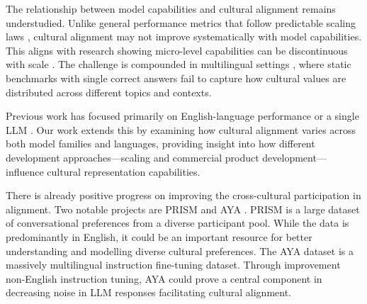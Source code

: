 The relationship between model capabilities and cultural alignment remains understudied. Unlike general performance metrics that follow predictable scaling laws \citep{kaplanScalingLawsNeural2020}, cultural alignment may not improve systematically with model capabilities. This aligns with research showing micro-level capabilities can be discontinuous with scale \citep{ganguliPredictabilitySurpriseLarge2022}. The challenge is compounded in multilingual settings \citep{hoffmannTrainingComputeoptimalLarge2022a}, where static benchmarks with single correct answers fail to capture how cultural values are distributed across different topics and contexts.

Previous work has focused primarily on English-language performance \citep{taoCulturalBiasCultural2024} or a single LLM \citep{openaiGPT4TechnicalReport2024,caoAssessingCrossculturalAlignment2023}. Our work extends this by examining how cultural alignment varies across both model families and languages, providing insight into how different development approaches---scaling and commercial product development---influence cultural representation capabilities.

There is already positive progress on improving the cross-cultural participation in alignment. Two notable projects are PRISM and AYA \citep{kirkPRISMAlignmentDataset2024,ustunAyaModelInstruction2024}. PRISM is a large dataset of conversational preferences from a diverse participant pool. While the data is predominantly in English, it could be an important resource for better understanding and modelling diverse cultural preferences. The AYA dataset is a massively multilingual instruction fine-tuning dataset. Through improvement non-English instruction tuning, AYA could prove a central component in decreasing noise in LLM responses facilitating cultural alignment.